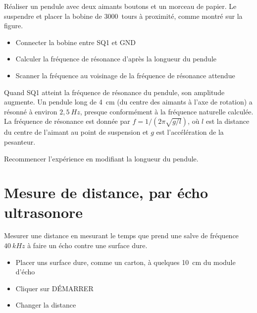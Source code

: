 \documentclass[a4paper,12pt,french]{sphinxmanual}
\let\sphinxpxdimen\pdfpxdimen\else\newdimen\sphinxpxdimen
\begin{document}

Réaliser un pendule avec deux aimants boutons et un morceau de papier.
Le suspendre et placer la bobine de 3000 tours à proximité, comme montré
sur la figure.
\begin{itemize}
\item {} 
Connecter la bobine entre SQ1 et GND

\item {} 
Calculer la fréquence de résonance d’après la longueur du pendule

\item {} 
Scanner la fréquence au voisinage de la fréquence de résonance
attendue

\end{itemize}


Quand SQ1 atteint la fréquence de résonance du pendule, son amplitude
augmente. Un pendule long de 4 cm (du centre des aimants à l’axe de
rotation) a résonné à environ \(2,5~Hz\), presque conformément à la
fréquence naturelle calculée. La fréquence de résonance est donnée par
\(f = 1/(2\pi\sqrt{g/l})\), où \(l\) est la distance du centre de
l’aimant au point de suspension et \(g\) est l’accélération de la
pesanteur.

Recommencer l’expérience en modifiant la longueur du pendule.


\section{Mesure de distance, par écho ultrasonore}
\label{\detokenize{6.4:mesure-de-distance-par-echo-ultrasonore}}\label{\detokenize{6.4::doc}}

Mesurer une distance en mesurant le temps que prend une salve de
fréquence \(40~kHz\) à faire un écho contre une surface dure.


\noindent\sphinxincludegraphics[width=300\sphinxpxdimen]{{sr04-dist}.pdf}
\begin{itemize}
\item {} 
Placer uns surface dure, comme un carton, à quelques 10 cm du module
d’écho

\item {} 
Cliquer sur DÉMARRER

\item {} 
Changer la distance

\end{itemize}
\end{document}
